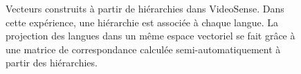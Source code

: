 \begin{itemize}
\begin{figure}[h!]
\caption{Vecteurs construits à partir de hiérarchies dans VideoSense. Dans cette expérience, une hiérarchie est associée à chaque langue. La projection des langues dans un même espace vectoriel se fait grâce à une matrice de correspondance calculée semi-automatiquement à partir des hiérarchies.}
\label{hierarchies-videosense}
\end{figure}

\end{itemize}

